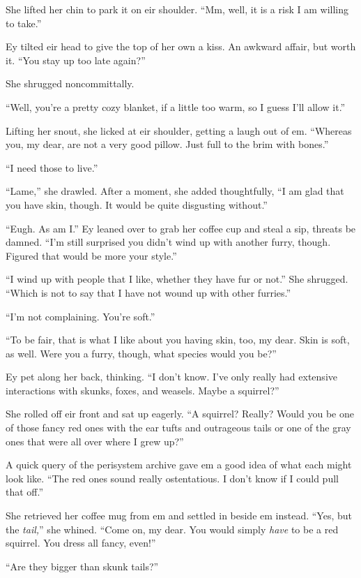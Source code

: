 She lifted her chin to park it on eir shoulder. ``Mm, well, it is a risk I am willing to take.''

Ey tilted eir head to give the top of her own a kiss. An awkward affair, but worth it. ``You stay up too late again?''

She shrugged noncommittally.

``Well, you're a pretty cozy blanket, if a little too warm, so I guess I'll allow it.''

Lifting her snout, she licked at eir shoulder, getting a laugh out of em. ``Whereas you, my dear, are not a very good pillow. Just full to the brim with bones.''

``I need those to live.''

``Lame,'' she drawled. After a moment, she added thoughtfully, ``I am glad that you have skin, though. It would be quite disgusting without.''

``Eugh. As am I.'' Ey leaned over to grab her coffee cup and steal a sip, threats be damned. ``I'm still surprised you didn't wind up with another furry, though. Figured that would be more your style.''

``I wind up with people that I like, whether they have fur or not.'' She shrugged. ``Which is not to say that I have not wound up with other furries.''

``I'm not complaining. You're soft.''

``To be fair, that is what I like about you having skin, too, my dear. Skin is soft, as well. Were you a furry, though, what species would you be?''

Ey pet along her back, thinking. ``I don't know. I've only really had extensive interactions with skunks, foxes, and weasels. Maybe a squirrel?''

She rolled off eir front and sat up eagerly. ``A squirrel? Really? Would you be one of those fancy red ones with the ear tufts and outrageous tails or one of the gray ones that were all over where I grew up?''

A quick query of the perisystem archive gave em a good idea of what each might look like. ``The red ones sound really ostentatious. I don't know if I could pull that off.''

She retrieved her coffee mug from em and settled in beside em instead. ``Yes, but the \emph{tail,}'' she whined. ``Come on, my dear. You would simply \emph{have} to be a red squirrel. You dress all fancy, even!''

``Are they bigger than skunk tails?''

